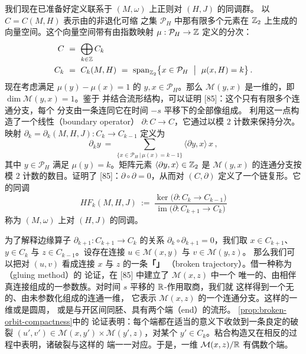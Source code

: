 我们现在已准备好定义联系于 $(M,\omega)$ 上正则对 $(H,J)$ 的\trFloer{}同调群。%
以 $C=C(M,H)$ 表示由\trHamiltonianVectorField{}的非退化可缩%
\trPeriodicOrbit{}之集 $\mathcal{P}_{H}$ 中那有限多个元素在 $\mathbb{Z}_{2}$ 上生成的%
向量空间。这个向量空间带有由指数映射 $\mu:\mathcal{P}_{H}\to\mathbb{Z}$ 定义的分次：
\begin{equation}\label{eq:floer-chain-C}
\begin{aligned}
C\ &=\ \bigoplus_{k\in\Z}C_{k}\\
C_{k}\ &=\ C_{k}(M,H)\ =\ \operatorname{span}_{\Z_{2}}\bigl\{x\in\mathcal{P}_{H}\ \bigm|\ \mu(x,H)=k\bigr\}\,.
\end{aligned}
\end{equation}
现在考虑满足 $\mu(y)-\mu(x)=1$ 的 $y,x\in\mathcal{P}_{H}$。那么\trManifold{}%
$\mathcal{M}(y,x)$ 是一维的，即 $\dim\mathcal{M}(y,x)=1$。鉴于\trCompactness{}%
并结合流形结构，可以证明 [85]：这个\trManifold{}只有有限多个连通分支，每个%
分支由一条\trConnectingOrbit{}连同它在时间 $-s$ 平移下的全部像组成。\trFloer{}%
利用这一点构造了一个线性\textbf{\trBoundaryOperator}（boundary operator）%
$\partial:C\to C$，它通过以模 $2$ 计数\trConnectingOrbit{}来保持分次。映射%
$\partial_{k}=\partial_{k}(M,H,J):C_{k}\to C_{k-1}$ 定义为
\begin{equation}\label{eq:floer-boundary-op}
\partial_{k}y\ =\ \sum_{\{x\in\mathcal{P}_{H}\,|\,\mu(x)=k-1\}}\langle\partial y,x\rangle\,x\,,
\end{equation}
其中 $y\in\mathcal{P}_{H}$ 满足 $\mu(y)=k$。矩阵元素%
$\langle\partial y,x\rangle\in\mathbb{Z}_{2}$ 是 $\mathcal{M}(y,x)$ 的连通分支按模%
$2$ 计数的数目。\trFloer{}证明了 [85]：$\partial\circ\partial=0$，从而对%
$(C,\partial)$ 定义了一个链复形。它的同调
\begin{equation}\label{eq:floer-homology-HF}
HF_{k}(M,H,J)\ :=\ \frac{\ker\bigl(\partial:C_{k}\to C_{k-1}\bigr)}{\operatorname{im}\bigl(\partial:C_{k+1}\to C_{k}\bigr)}
\end{equation}
称为 $(M,\omega)$ 上对 $(H,J)$ 的\trFloer{}同调。

为了解释边缘算子 $\partial_{k+1}:C_{k+1}\to C_{k}$ 的关系%
$\partial_{k}\circ\partial_{k+1}=0$，我们取 $x\in C_{k+1}$、$y\in C_{k}$ 与%
$z\in C_{k-1}$。设存在连接 $u\in\mathcal{M}(x,y)$ 与 $v\in\mathcal{M}(y,z)$。%
那么我们可以把对 $(u,v)$ 看成连接 $x$ 与 $z$ 的一条\textbf{「\trBrokenTrajectory」}%
（broken trajectory）。借一种称为\textbf{\trGluingMethod}（gluing method）的%
\trPerturbation{}论证，\trFloer{}在 [85] 中建立了 $\mathcal{M}(x,z)$ 中一个%
唯一的、由相伴真连接组成的一参数族。对时间 $s$ 平移的 $\mathbb{R}$-作用取商，我们就%
这样得到一个无\trBoundary{}的、由未参数化\trOrbit{}组成的连通一维\trManifold，%
它表示 $\mathcal{M}(x,z)$ 的一个连通分支。这样的一维\trManifold{}或是圆周，%
或是与开区间同胚、具有两个端（end）的流形。%
\cref{prop:broken-orbit-compactness}中的%
\trCompactness{}论证表明：每个端都在适当的意义下收敛到一条良定的破裂%
\trTrajectory{} $(u',v')\in\mathcal{M}(x,y')\times\mathcal{M}(y',z)$，对某个%
$y'\in C_{k}$。粘合构造又在相反的过程中表明，诸破裂\trTrajectory{}与这样的%
端一一对应。于是，一维\trManifold{} $\mathcal{M}(x,z)/\mathbb{R}$ 有偶数个端。

